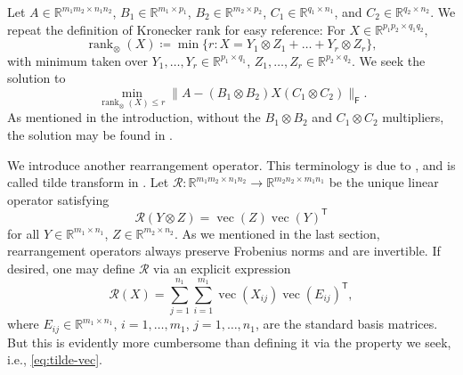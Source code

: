 \documentclass[11pt,reqno]{amsart}
\newcommand{\tp}{{\scriptscriptstyle\mathsf{T}}}
\newcommand{\F}{{\scriptscriptstyle\mathsf{F}}}
\DeclareMathOperator{\rank}{rank}
\DeclareMathOperator{\vect}{vec}
\theoremstyle{definition}
\numberwithin{equation}{section}
\newcommand{\R}{\mathbb{R}}
\begin{document}
Let $A \in \R^{m_1m_2 \times n_1n_2}$, $B_1 \in \R^{m_1 \times p_1}$, $B_2 \in \R^{m_2 \times p_2}$, $C_1 \in \R^{q_1 \times n_1}$, and $C_2 \in \R^{q_2 \times n_2}$. We repeat the definition of Kronecker rank for easy reference: For $X \in \R^{p_1p_2 \times q_1q_2}$,
\[
\rank_\otimes (X) \coloneqq  \min \{ r : X = Y_1 \otimes Z_1 + \dots + Y_r \otimes Z_r\},
\]
with minimum taken over $Y_1,\dots,Y_r\in \R^{p_1 \times q_1}$, $Z_1,\dots,Z_r \in \R^{p_2 \times q_2}$. We seek the solution to
\begin{equation}\label{eq:Kronecker-problem} 
\min_{\rank_\otimes(X) \le r} \lVert  A- (B_1 \otimes B_2)X(C_1 \otimes C_2) \rVert_\F.
\end{equation}
As mentioned in the introduction, without the $B_1 \otimes B_2$ and $C_1 \otimes C_2$ multipliers, the solution may be found in \cite{allen,kon, vanLoan}.

We introduce another rearrangement operator. This terminology is due to \cite{vanLoan}, and is called tilde transform in \cite{kon}. Let $\mathcal{R} : \R^{m_1 m_2 \times n_1 n_2} \to \R^{m_2 n_2 \times m_1 n_1}$ be the unique linear operator satisfying
\begin{equation}\label{eq:tilde-vec}
    \mathcal{R}(Y \otimes Z) = \vect(Z)\vect(Y)^\tp
\end{equation}
for all $Y \in \R^{m_1 \times n_1}$, $Z \in \R^{m_2 \times n_2}$. As we mentioned in the last section, rearrangement operators always preserve Frobenius norms and are invertible. If desired, one may define $\mathcal{R}$ via an explicit expression
\[
\mathcal{R}(X) = \sum_{j=1}^{n_1} \sum_{i=1}^{m_1} \vect(X_{ij})\vect(E_{ij})^\tp,
\]
where $E_{ij} \in \R^{m_1 \times n_1}$, $i = 1,\dots, m_1$, $j = 1,\dots, n_1$, are the standard basis matrices. But this is evidently more cumbersome than defining it via the property we seek, i.e., \eqref{eq:tilde-vec}.
\end{document}
